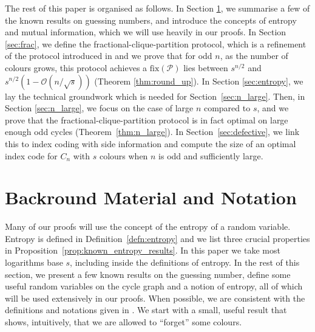 \documentclass{birkjour}
\theoremstyle{indenteddefinition}
\theoremstyle{indenteddefinition}
\numberwithin{equation}{section}
\renewcommand{\Pr}{\mathcal{P}}
\renewcommand{\O}{\mathcal{O}}
\newcommand{\fix}{\mbox{fix}}
\begin{document}
The rest of this paper is organised as follows. In Section \ref{sec:notation}, we summarise a few of the known results on guessing numbers, and introduce the concepts of entropy and mutual information, which we will use heavily in our proofs. In Section \ref{sec:frac}, we define the fractional-clique-partition protocol, which is a refinement of the protocol introduced in \cite{Christofides2011guessing} and we prove that for odd $n$, as the number of colours grows, this protocol achieves a $\fix(\Pr)$ lies between $s^{n/2}$ and $s^{n/2}(1-\O(n/\sqrt{s}))$ (Theorem \ref{thm:round_up}). In Section \ref{sec:entropy}, we lay the technical groundwork which is needed for Section~\ref{sec:n_large}. Then, in Section \ref{sec:n_large}, we focus on the case of large $n$ compared to $s$, and we prove that the fractional-clique-partition protocol is in fact optimal on large enough odd cycles (Theorem~\ref{thm:n_large}). In Section~\ref{sec:defective}, we link this to index coding with side information and compute the size of an optimal index code for $C_n$ with $s$ colours when $n$ is odd and sufficiently large. 






\section{Backround Material and Notation}
\label{sec:notation}





Many of our proofs will use the concept of the entropy of a random variable. Entropy is defined in Definition~\ref{defn:entropy} and we list three crucial properties in Proposition~\ref{prop:known_entropy_results}. 
In this paper we take most logarithms base $s$, including inside the definitions of entropy.
In the rest of this section, we present a few known results on the guessing number, define some useful random variables on the cycle graph and a notion of entropy, all of which will be used extensively in our proofs. When possible, we are consistent with the definitions and notations given in \cite{Cameron2014guessing,Chang2014linear,Christofides2011guessing,Baber2014graph,Riis2007graph,Riis2007information}. We start with a small, useful result that shows, intuitively, that we are allowed to ``forget'' some colours. 
\end{document}
